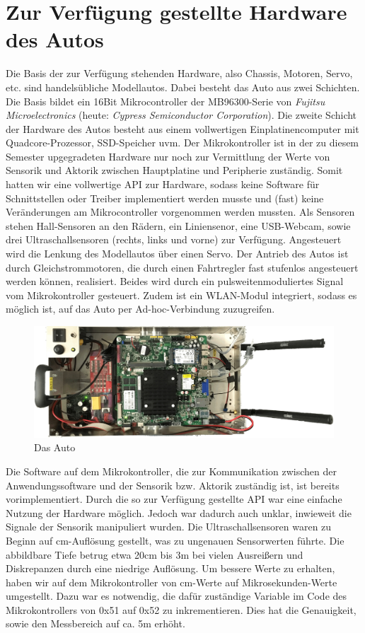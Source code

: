 \section{Zur Verfügung gestellte Hardware des Autos}
\label{sec:grundlegendesHW}

Die Basis der zur Verfügung stehenden Hardware, also Chassis, Motoren, Servo, etc. sind handelsübliche Modellautos. Dabei besteht das Auto aus zwei Schichten. Die Basis bildet ein 16Bit Mikrocontroller der MB96300-Serie von \textit{Fujitsu Microelectronics} (heute: \textit{Cypress Semiconductor Corporation}). Die zweite Schicht der Hardware des Autos besteht aus einem vollwertigen Einplatinencomputer mit Quadcore-Prozessor, SSD-Speicher uvm. Der Mikrokontroller ist in der zu diesem Semester upgegradeten Hardware nur noch zur Vermittlung der Werte von Sensorik und Aktorik zwischen Hauptplatine und Peripherie zuständig. Somit hatten wir eine vollwertige API zur Hardware, sodass keine Software für Schnittstellen oder Treiber implementiert werden musste und (fast) keine Veränderungen am Mikrocontroller vorgenommen werden mussten. Als Sensoren stehen Hall-Sensoren an den Rädern, ein Liniensenor, eine USB-Webcam, sowie drei Ultraschallsensoren (rechts, links und vorne) zur Verfügung. Angesteuert wird die Lenkung des Modellautos über einen Servo. Der Antrieb des Autos ist durch Gleichstrommotoren, die durch einen Fahrtregler fast stufenlos angesteuert werden können, realisiert. Beides wird durch ein pulsweitenmoduliertes Signal vom Mikrokontroller gesteuert. Zudem ist ein WLAN-Modul integriert, sodass es möglich ist, auf das Auto per Ad-hoc-Verbindung zuzugreifen. 

\begin{figure}[htbp] 
	\centering
	\includegraphics[width=350pt]{images/Animauto.jpg}
	\caption{Das Auto}
	\label{fig:DasAuto}
\end{figure}

Die Software auf dem Mikrokontroller, die zur Kommunikation zwischen der Anwendungssoftware und der Sensorik bzw. Aktorik zuständig ist, ist bereits vorimplementiert. Durch die so zur Verfügung gestellte API war eine einfache Nutzung der Hardware möglich. Jedoch war dadurch auch unklar, inwieweit die Signale der Sensorik manipuliert wurden. Die Ultraschallsensoren waren zu Beginn auf cm-Auflösung gestellt, was zu ungenauen Sensorwerten führte. Die abbildbare Tiefe betrug etwa 20cm bis 3m bei vielen Ausreißern und Diskrepanzen durch eine niedrige Auflösung. Um bessere Werte zu erhalten, haben wir auf dem Mikrokontroller von cm-Werte auf Mikrosekunden-Werte umgestellt. Dazu war es notwendig, die dafür zuständige Variable im Code des Mikrokontrollers von 0x51 auf 0x52 zu inkrementieren. Dies hat die Genauigkeit, sowie den Messbereich auf ca. 5m erhöht.